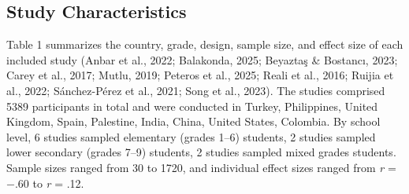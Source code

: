 \documentclass[man,a4paper,12pt,floatsintext,nolmodern,notab]{apa7}
\begin{document}
\subsection{Study Characteristics}
Table 1 summarizes the country, grade, design, sample size, and effect size of each included study (Anbar et al., 2022; Balakonda, 2025; Beyaztaş \& Bostancı, 2023; Carey et al., 2017; Mutlu, 2019; Peteros et al., 2025; Reali et al., 2016; Ruijia et al., 2022; Sánchez-Pérez et al., 2021; Song et al., 2023). The studies comprised 5389 participants in total and were conducted in Turkey, Philippines, United Kingdom, Spain, Palestine, India, China, United States, Colombia. By school level, 6 studies sampled elementary (grades 1–6) students, 2 studies sampled lower secondary (grades 7–9) students, 2 studies sampled mixed grades students. Sample sizes ranged from 30 to 1720, and individual effect sizes ranged from \textit{r} = \ensuremath{-}.60 to \textit{r} = .12.
\end{document}
